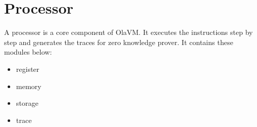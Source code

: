 \section{Processor}\label{sec: processor}
A processor is a core component of OlaVM. It executes the instructions step by step and generates the traces for zero knowledge prover.
It contains these modules below:
\begin{itemize}
    \item register
    \item memory
    \item storage
    \item trace
\end{itemize}

